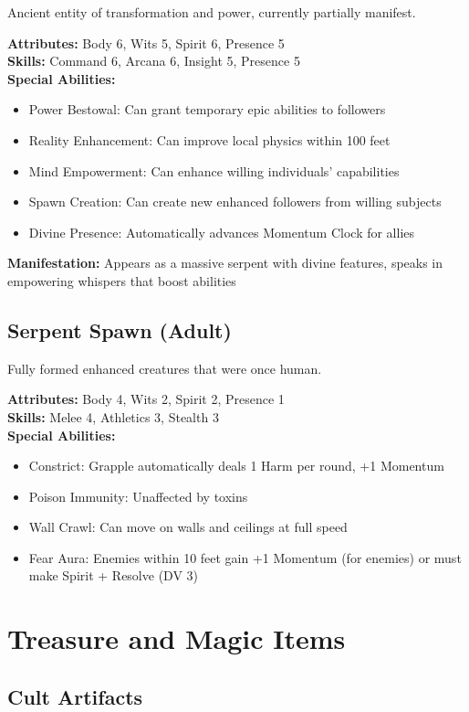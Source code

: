 \documentclass[12pt,twoside]{article}
\begin{document}
Ancient entity of transformation and power, currently partially manifest.

\textbf{Attributes:} Body 6, Wits 5, Spirit 6, Presence 5 \\
\textbf{Skills:} Command 6, Arcana 6, Insight 5, Presence 5 \\
\textbf{Special Abilities:}
\begin{itemize}
  \item Power Bestowal: Can grant temporary epic abilities to followers
  \item Reality Enhancement: Can improve local physics within 100 feet
  \item Mind Empowerment: Can enhance willing individuals' capabilities
  \item Spawn Creation: Can create new enhanced followers from willing subjects
  \item Divine Presence: Automatically advances Momentum Clock for allies
\end{itemize}
\textbf{Manifestation:} Appears as a massive serpent with divine features, speaks in empowering whispers that boost abilities

\subsection{Serpent Spawn (Adult)}

Fully formed enhanced creatures that were once human.

\textbf{Attributes:} Body 4, Wits 2, Spirit 2, Presence 1 \\
\textbf{Skills:} Melee 4, Athletics 3, Stealth 3 \\
\textbf{Special Abilities:}
\begin{itemize}
  \item Constrict: Grapple automatically deals 1 Harm per round, +1 Momentum
  \item Poison Immunity: Unaffected by toxins
  \item Wall Crawl: Can move on walls and ceilings at full speed
  \item Fear Aura: Enemies within 10 feet gain +1 Momentum (for enemies) or must make Spirit + Resolve (DV 3)
\end{itemize}

\section{Treasure and Magic Items}

\subsection{Cult Artifacts}
\end{document}
